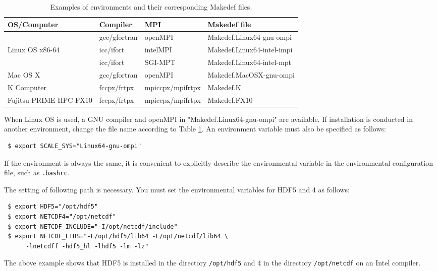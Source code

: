 \begin{table}[htb]
\begin{center}
\caption{Examples of environments and their corresponding Makedef files.}
\begin{tabularx}{150mm}{|l|l|X|l|} \hline
 \rowcolor[gray]{0.9} OS/Computer & Compiler & MPI & Makedef file \\ \hline
                 & gcc/gfortran & openMPI  & Makedef.Linux64-gnu-ompi \\ \cline{2-4}
 Linux OS x86-64 & icc/ifort    & intelMPI & Makedef.Linux64-intel-impi \\ \cline{2-4}
                 & icc/ifort    & SGI-MPT  & Makedef.Linux64-intel-mpt \\ \hline
 Mac OS X        & gcc/gfortran & openMPI  & Makedef.MacOSX-gnu-ompi \\ \hline
 K Computer      & fccpx/frtpx  & mpiccpx/mpifrtpx & Makedef.K \\ \hline
 Fujitsu PRIME-HPC FX10 & fccpx/frtpx & mpiccpx/mpifrtpx & Makedef.FX10 \\ \hline
\end{tabularx}
\label{tab:makedef}
\end{center}
\end{table}

When Linux OS is used, a GNU compiler and openMPI in "Makedef.Linux64-gnu-ompi" are available. If installation is conducted in another environment, change the file name according to Table \ref{tab:makedef}. An environment variable must also be specified as follows:
\begin{verbatim}
 $ export SCALE_SYS="Linux64-gnu-ompi"
\end{verbatim}
If the environment is always the same, it is convenient to explicitly describe the environmental variable in the environmental configuration file, such as \verb|.bashrc|.

The setting of following path is necessary. You must set the environmental variables for HDF5 and {\netcdf}4 as follows: 
\begin{verbatim}
 $ export HDF5="/opt/hdf5"
 $ export NETCDF4="/opt/netcdf"
 $ export NETCDF_INCLUDE="-I/opt/netcdf/include"
 $ export NETCDF_LIBS="-L/opt/hdf5/lib64 -L/opt/netcdf/lib64 \
      -lnetcdff -hdf5_hl -lhdf5 -lm -lz"
\end{verbatim}
The above example shows that
HDF5 is installed in the directory \verb|/opt/hdf5|
and {\netcdf}4 in the directory \verb|/opt/netcdf|
on an Intel compiler.


